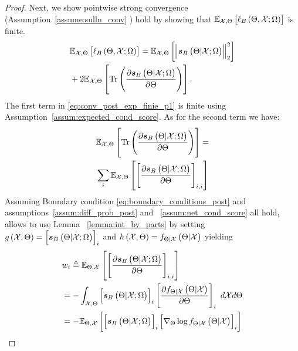 \begin{proof}
    
    Next, we show pointwise strong convergence (Assumption~\ref{assume:sulln_conv} ) hold by showing {that %
    $\expectation{\ell_B\brackets{\pr,\xset;\Omega}}{\xset,\pr}$ is finite.   }
    {
    \begin{align}\label{eq:conv_post_exp_finie_p1}
        &\expectation{\ell_B\brackets{\pr,\xset;\Omega}}{\xset,\pr}=
        \expectation{\norm{\postscore{\pr}{\xset;\Omega}}_2^2}{\xset,\pr}\nonumber\\
        &+2\expectation{{\trace{\frac{\partial \postscore{\pr}{\xset;\Omega}}{\partial\pr}}}}{\xset,\pr}.
    \end{align}
    The first term in \eqref{eq:conv_post_exp_finie_p1} is finite using Assumption~\ref{assum:expected_cond_score}. As for the second term we have:
    \begin{align}\label{eq:conv_post_exp_finie_p2}
        &\expectation{{\trace{\frac{\partial \postscore{\pr}{\xset;\Omega}}{\partial\pr}}}}{\xset,\pr}=\nonumber\\
        &\sum_i \expectation{\squareb{\frac{\partial \postscore{\pr}{\xset;\Omega}}{\partial\pr}}_{i,i}}{\xset,\pr}
    \end{align}
    Assuming Boundary {condition} \eqref{eq:boundary_conditions_post} {and} assumptions~\ref{assum:diff_prob_post} and ~\ref{assum:net_cond_score}{ all hold, allows to use %
    }
    Lemma ~\ref{lemma:int_by_parts} by setting $g\brackets{\xset,\pr}=\squareb{\postscore{\pr}{\xset;\Omega}}_i$ and $h\brackets{\xset,\pr}=\probt{\pr|\xset}{\pr|\xset}$ yielding%
    \begin{align}\label{eq:conv_post_exp_finie_p3}
       &w_i\triangleq\expectation{\squareb{\frac{\partial \postscore{\pr}{\xset;\Omega}}{\partial\pr}}_{i,i}}{\pr,\xset}\nonumber\\
       &=-\int_{\xset,\pr} \squareb{\postscore{\pr}{\xset;\Omega}}_i \squareb{\frac{\partial\probt{\pr|\xset}{\pr|\xset}}{\partial\pr}}_i\ d\xset d\pr\nonumber\\
       &=-\expectation{\squareb{\postscore{\pr}{\xset;\Omega}}_i \squareb{\nabla_{\pr}\log\probt{\pr|\xset}{\pr|\xset}}_i}{\pr,\xset}\nonumber\\

\end{align}}
\end{proof}
